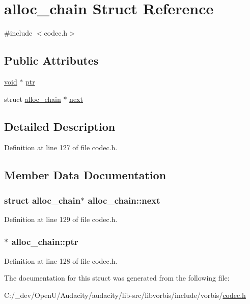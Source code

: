 \hypertarget{structalloc__chain}{}\section{alloc\+\_\+chain Struct Reference}
\label{structalloc__chain}


{\ttfamily \#include $<$codec.\+h$>$}

\subsection*{Public Attributes}
\begin{DoxyCompactItemize}
\item 
\hyperlink{sound_8c_ae35f5844602719cf66324f4de2a658b3}{void} $\ast$ \hyperlink{structalloc__chain_a564538413768f266bd5bda09d892e99d}{ptr}
\item 
struct \hyperlink{structalloc__chain}{alloc\+\_\+chain} $\ast$ \hyperlink{structalloc__chain_a596f6605e59080015c3c6dfd07326c83}{next}
\end{DoxyCompactItemize}


\subsection{Detailed Description}


Definition at line 127 of file codec.\+h.



\subsection{Member Data Documentation}
\subsubsection[{\texorpdfstring{next}{next}}]{\setlength{\rightskip}{0pt plus 5cm}struct {\bf alloc\+\_\+chain}$\ast$ alloc\+\_\+chain\+::next}\hypertarget{structalloc__chain_a596f6605e59080015c3c6dfd07326c83}{}\label{structalloc__chain_a596f6605e59080015c3c6dfd07326c83}


Definition at line 129 of file codec.\+h.

\subsubsection[{\texorpdfstring{ptr}{ptr}}]{$\ast$ alloc\+\_\+chain\+::ptr}\hypertarget{structalloc__chain_a564538413768f266bd5bda09d892e99d}{}\label{structalloc__chain_a564538413768f266bd5bda09d892e99d}


Definition at line 128 of file codec.\+h.



The documentation for this struct was generated from the following file\+:\begin{DoxyCompactItemize}
\item 
C\+:/\+\_\+dev/\+Open\+U/\+Audacity/audacity/lib-\/src/libvorbis/include/vorbis/\hyperlink{codec_8h}{codec.\+h}\end{DoxyCompactItemize}
